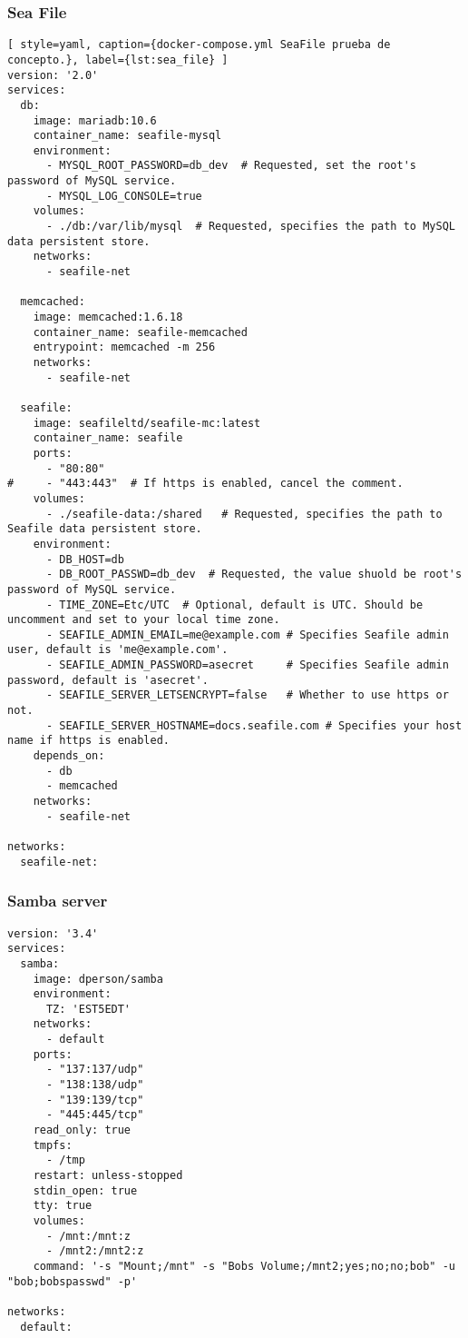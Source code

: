 \subsubsection{Sea File}
\begin{lstlisting}[ style=yaml, caption={docker-compose.yml SeaFile prueba de concepto.}, label={lst:sea_file} ]
version: '2.0'
services:
  db:
    image: mariadb:10.6
    container_name: seafile-mysql
    environment:
      - MYSQL_ROOT_PASSWORD=db_dev  # Requested, set the root's password of MySQL service.
      - MYSQL_LOG_CONSOLE=true
    volumes:
      - ./db:/var/lib/mysql  # Requested, specifies the path to MySQL data persistent store.
    networks:
      - seafile-net

  memcached:
    image: memcached:1.6.18
    container_name: seafile-memcached
    entrypoint: memcached -m 256
    networks:
      - seafile-net
          
  seafile:
    image: seafileltd/seafile-mc:latest
    container_name: seafile
    ports:
      - "80:80"
#     - "443:443"  # If https is enabled, cancel the comment.
    volumes:
      - ./seafile-data:/shared   # Requested, specifies the path to Seafile data persistent store.
    environment:
      - DB_HOST=db
      - DB_ROOT_PASSWD=db_dev  # Requested, the value shuold be root's password of MySQL service.
      - TIME_ZONE=Etc/UTC  # Optional, default is UTC. Should be uncomment and set to your local time zone.
      - SEAFILE_ADMIN_EMAIL=me@example.com # Specifies Seafile admin user, default is 'me@example.com'.
      - SEAFILE_ADMIN_PASSWORD=asecret     # Specifies Seafile admin password, default is 'asecret'.
      - SEAFILE_SERVER_LETSENCRYPT=false   # Whether to use https or not.
      - SEAFILE_SERVER_HOSTNAME=docs.seafile.com # Specifies your host name if https is enabled.
    depends_on:
      - db
      - memcached
    networks:
      - seafile-net

networks:
  seafile-net:
\end{lstlisting}

\subsubsection{Samba server}
\begin{lstlisting}[style=yaml, caption={docker-compose.yml Samba prueba de concepto.}, label={lst:samba} ]
version: '3.4'
services:
  samba:
    image: dperson/samba
    environment:
      TZ: 'EST5EDT'
    networks:
      - default
    ports:
      - "137:137/udp"
      - "138:138/udp"
      - "139:139/tcp"
      - "445:445/tcp"
    read_only: true
    tmpfs:
      - /tmp
    restart: unless-stopped
    stdin_open: true
    tty: true
    volumes:
      - /mnt:/mnt:z
      - /mnt2:/mnt2:z
    command: '-s "Mount;/mnt" -s "Bobs Volume;/mnt2;yes;no;no;bob" -u "bob;bobspasswd" -p'

networks:
  default:
\end{lstlisting}

